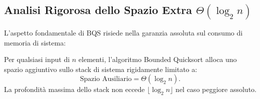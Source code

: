 \FloatBarrier

\subsection{Analisi Rigorosa dello Spazio Extra \texorpdfstring{$\Theta(\log_2 n)$}{Theta(log n)}}
\label{subsec:bqs-space-analysis}

L'aspetto fondamentale di BQS risiede nella garanzia assoluta sul consumo di memoria di sistema:

\begin{theorem}
\label{thm:bqs-space-guarantee}
Per qualsiasi input di $n$ elementi, l'algoritmo Bounded Quicksort alloca uno spazio aggiuntivo sullo stack di sistema rigidamente limitato a:
\begin{equation}
  \text{Spazio Ausiliario} = \Theta(\log_2 n).
\end{equation}
La profondità massima dello stack non eccede $\lfloor \log_2 n \rfloor$ nel caso peggiore assoluto.
\end{theorem}

